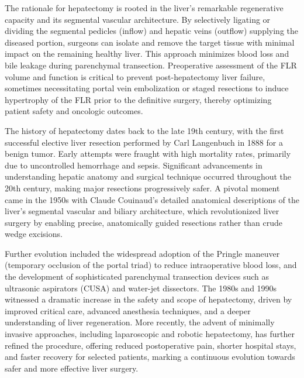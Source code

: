 The rationale for hepatectomy is rooted in the liver's remarkable regenerative capacity and its segmental vascular architecture. By selectively ligating or dividing the segmental pedicles (inflow) and hepatic veins (outflow) supplying the diseased portion, surgeons can isolate and remove the target tissue with minimal impact on the remaining healthy liver. This approach minimizes blood loss and bile leakage during parenchymal transection. Preoperative assessment of the FLR volume and function is critical to prevent post-hepatectomy liver failure, sometimes necessitating portal vein embolization or staged resections to induce hypertrophy of the FLR prior to the definitive surgery, thereby optimizing patient safety and oncologic outcomes.

The history of hepatectomy dates back to the late 19th century, with the first successful elective liver resection performed by Carl Langenbuch in 1888 for a benign tumor. Early attempts were fraught with high mortality rates, primarily due to uncontrolled hemorrhage and sepsis. Significant advancements in understanding hepatic anatomy and surgical technique occurred throughout the 20th century, making major resections progressively safer. A pivotal moment came in the 1950s with Claude Couinaud's detailed anatomical descriptions of the liver's segmental vascular and biliary architecture, which revolutionized liver surgery by enabling precise, anatomically guided resections rather than crude wedge excisions.

Further evolution included the widespread adoption of the Pringle maneuver (temporary occlusion of the portal triad) to reduce intraoperative blood loss, and the development of sophisticated parenchymal transection devices such as ultrasonic aspirators (CUSA) and water-jet dissectors. The 1980s and 1990s witnessed a dramatic increase in the safety and scope of hepatectomy, driven by improved critical care, advanced anesthesia techniques, and a deeper understanding of liver regeneration. More recently, the advent of minimally invasive approaches, including laparoscopic and robotic hepatectomy, has further refined the procedure, offering reduced postoperative pain, shorter hospital stays, and faster recovery for selected patients, marking a continuous evolution towards safer and more effective liver surgery.

